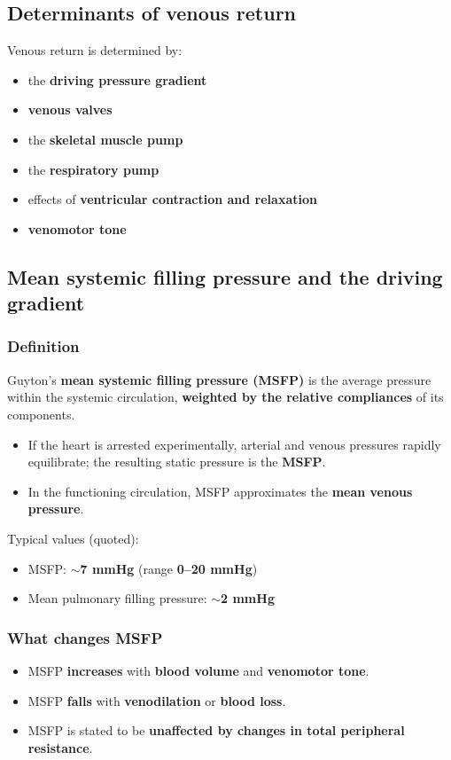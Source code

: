 \documentclass[11pt,a4paper]{article}
\begin{document}
\subsection{Determinants of venous return}
Venous return is determined by:
\begin{itemize}
\item the \textbf{driving pressure gradient}
\item \textbf{venous valves}
\item the \textbf{skeletal muscle pump}
\item the \textbf{respiratory pump}
\item effects of \textbf{ventricular contraction and relaxation}
\item \textbf{venomotor tone}
\end{itemize}

\subsection{Mean systemic filling pressure and the driving gradient}

\subsubsection{Definition}
Guyton's \textbf{mean systemic filling pressure (MSFP)} is the average pressure within the systemic circulation, \textbf{weighted by the relative compliances} of its components.
\begin{itemize}
\item If the heart is arrested experimentally, arterial and venous pressures rapidly equilibrate; the resulting static pressure is the \textbf{MSFP}.
\item In the functioning circulation, MSFP approximates the \textbf{mean venous pressure}.
\end{itemize}

Typical values (quoted):
\begin{itemize}
\item MSFP: \textbf{$\sim$7 mmHg} (range \textbf{0--20 mmHg})
\item Mean pulmonary filling pressure: \textbf{$\sim$2 mmHg}
\end{itemize}

\subsubsection{What changes MSFP}
\begin{itemize}
\item MSFP \textbf{increases} with \textbf{blood volume} and \textbf{venomotor tone}.
\item MSFP \textbf{falls} with \textbf{venodilation} or \textbf{blood loss}.
\item MSFP is stated to be \textbf{unaffected by changes in total peripheral resistance}.
\end{itemize}
\end{document}
